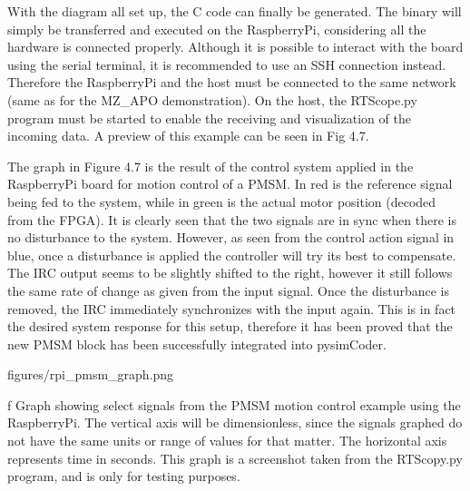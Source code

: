 \quad With the diagram all set up, the C code can finally be generated. The binary will simply
be transferred and executed on the RaspberryPi, considering all the hardware is connected properly.
Although it is possible to interact with the board using the serial terminal, it is recommended
to use an SSH connection instead. Therefore the RaspberryPi and the host must be connected to the
same network (same as for the MZ_APO demonstration). On the host, the RTScope.py program must be
started to enable the receiving and visualization of the incoming data. A preview of this example
can be seen in Fig 4.7. 

\quad The graph in Figure 4.7 is the result of the control system applied in the RaspberryPi board for
motion control of a PMSM. In red is the reference signal being fed to the system, while in green is the
actual motor position (decoded from the FPGA). It is clearly seen that the two signals are in sync when
there is no disturbance to the system. However, as seen from the control action signal in blue, once a
disturbance is applied the controller will try its best to compensate. The IRC output seems to be slightly
shifted to the right, however it still follows the same rate of change as given from the input signal. Once
the disturbance is removed, the IRC immediately synchronizes with the input again. This is in fact the desired
system response for this setup, therefore it has been proved that the new PMSM block has been successfully
integrated into pysimCoder. 

\midinsert {}
\picw=15cm \cinspic figures/rpi_pmsm_graph.png
\caption/f Graph showing select signals from the PMSM motion control example using the RaspberryPi.
The vertical axis will be dimensionless, since the signals graphed do not have the same units or
range of values for that matter. The horizontal axis represents time in seconds. This graph is a
screenshot taken from the RTScopy.py program, and is only for testing purposes. 
\endinsert